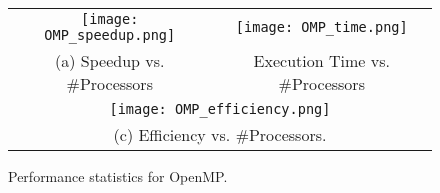 \documentclass{article}
\begin{document}
\begin{enumerate}
	\begin{figure}[p] %
		\hspace*{-0.25\linewidth}\begin{tabular}{cc}
			\texttt{[image: OMP\_speedup.png]} & \texttt{[image: OMP\_time.png]} \\
			(a) Speedup vs. \#Processors & Execution Time vs. \#Processors\\[6pt]
			\multicolumn{2}{c}{\texttt{[image: OMP\_efficiency.png]}}\\
			\multicolumn{2}{c}{(c) Efficiency vs. \#Processors.}
		\end{tabular}
		\caption{Performance statistics for OpenMP.}
		\label{fig:omp_performance}
	\end{figure}

\end{enumerate}
\end{document}
